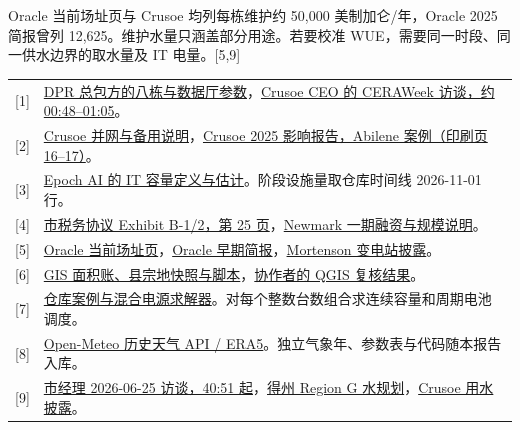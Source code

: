 \documentclass[UTF8,fontset=fandol,12pt,a4paper]{ctexart}
\renewcommand{\arraystretch}{1.25}\raggedbottom
\newcommand{\sect}[1]{\par\vspace{1.8mm}{\sffamily\bfseries\fontsize{13}{18}\selectfont\color{green}#1\par}}
\newcommand{\fine}[1]{{\small\color{muted}#1\par}}
\newcommand{\sref}[1]{{\sffamily\small\color{green}[#1]}}
\begin{document}
\fine{Oracle 当前场址页与 Crusoe 均列每栋维护约 50,000 美制加仑/年，Oracle 2025 简报曾列 12,625。维护水量只涵盖部分用途。若要校准 WUE，需要同一时段、同一供水边界的取水量及 IT 电量。\sref{5,9}}
\sect{原始依据与复算入口}
{\small\renewcommand{\arraystretch}{1.14}\begin{tabularx}{\linewidth}{@{}L{8mm}Y@{}}
{[1]}&\href{https://www.dpr.com/projects/crusoe-abilene-data-center}{DPR 总包方的八栋与数据厅参数}，\href{https://www.youtube.com/watch?v=cH7tiy7s17A\&t=48s}{Crusoe CEO 的 CERAWeek 访谈，约 00:48–01:05}。\\
{[2]}&\href{https://www.crusoe.ai/resources/newsroom/crusoe-expands-ai-data-center-campus-in-abilene-to-1-2-gigawatts}{Crusoe 并网与备用说明}，\href{https://media.ffycdn.net/us/crusoe/PL5TuZz5apXB9pVsd3H1.pdf}{Crusoe 2025 影响报告，Abilene 案例（印刷页 16–17）}。\\
{[3]}&\href{https://epoch.ai/graphs/largest-ai-data-centers-by-power-capacity}{Epoch AI 的 IT 容量定义与估计}。阶段设施量取仓库时间线 2026-11-01 行。\\
{[4]}&\href{https://abilenetx.gov/DocumentCenter/View/39456/Lancium-LLC-Abilene-Second-Amended-and-Restated-Tax-Abatement-Agreement-PDF\#page=25}{市税务协议 Exhibit B-1/2，第 25 页}，\href{https://www.nmrk.com/insights/press-releases/newmark-advises-on-3-4-billion-joint-venture-on-one-million-square-foot-texas-data-center}{Newmark 一期融资与规模说明}。\\
{[5]}&\href{https://www.oracle.com/data-centers/abilene/}{Oracle 当前场址页}，\href{https://arrington.house.gov/uploadedfiles/final_oracle_oai_data_center_fact_sheet_092225b.pdf\#page=2}{Oracle 早期简报}，\href{https://www.mortenson.com/projects/abilene-data-center-development}{Mortenson 变电站披露}。\\
{[6]}&\href{https://github.com/RL-RedLeaf/AIDC-test/tree/9301ec74699d58157999d672a8249c739ff7cfdc/data/geographic_case_abilene_20261122/eight_building_land_review}{GIS 面积账、县宗地快照与脚本}，\href{https://github.com/RL-RedLeaf/AIDC-test/issues/1\#issuecomment-7075596106}{协作者的 QGIS 复核结果}。\\
{[7]}&\href{https://github.com/RL-RedLeaf/AIDC-test/tree/5374865a8234cd5608c243abc99dfe73bdd18493/data/geographic_case_abilene_20261122}{仓库案例与混合电源求解器}。对每个整数台数组合求连续容量和周期电池调度。\\
{[8]}&\href{https://open-meteo.com/en/docs/historical-weather-api}{Open-Meteo 历史天气 API / ERA5}。独立气象年、参数表与代码随本报告入库。\\
{[9]}&\href{https://american-audacity.buzzsprout.com/1821492/episodes/19398965-emily-crawford-abilene-city-manager}{市经理 2026-06-25 访谈，40:51 起}，\href{https://www.twdb.texas.gov/waterplanning/rwp/plans/2026/G/RegionG_2026_RWP_VolumeI.pdf\#page=607}{得州 Region G 水规划}，\href{https://www.crusoe.ai/resources/blog/an-inside-look-at-the-abilene-ai-data-center}{Crusoe 用水披露}。
\end{tabularx}}
\end{document}
